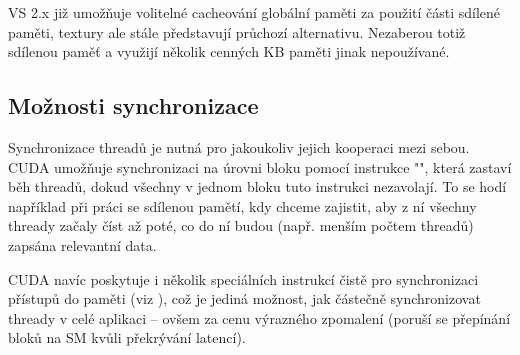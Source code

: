     VS 2.x již umožňuje volitelné cacheování globální paměti za použití části sdílené paměti, textury ale stále představují průchozí alternativu. Nezaberou totiž sdílenou paměť a využijí několik cenných KB paměti jinak nepoužívané.

    \subsection{Možnosti synchronizace}

    Synchronizace threadů je nutná pro jakoukoliv jejich kooperaci mezi sebou. CUDA umožňuje synchronizaci na úrovni bloku pomocí instrukce \Vr"", která zastaví běh threadů, dokud všechny v jednom bloku tuto instrukci nezavolají. To se hodí například při práci se sdílenou pamětí, kdy chceme zajistit, aby z ní všechny thready začaly číst až poté, co do ní budou (např. menším počtem threadů) zapsána relevantní data.

    CUDA navíc poskytuje i několik speciálních instrukcí čistě pro synchronizaci přístupů do paměti (viz \cite[přílohy]{CUDA programming g.}), což je jediná možnost, jak částečně synchronizovat thready v celé aplikaci -- ovšem za cenu výrazného zpomalení (poruší se přepínání bloků na SM kvůli překrývání latencí).

